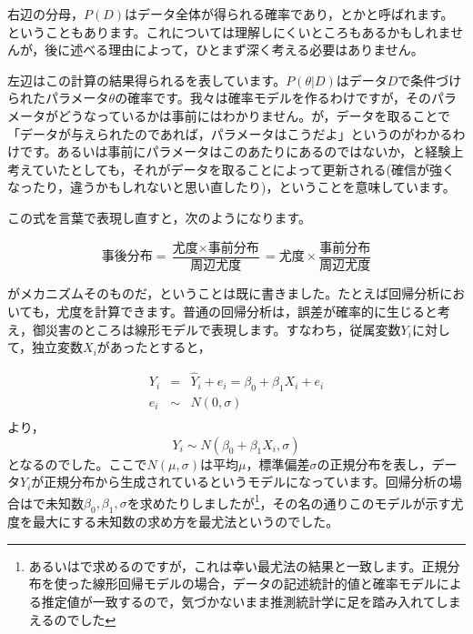 \documentclass{ltjsbook}
\begin{document}
右辺の分母，$P(D)$はデータ全体が得られる確率であり，とかと呼ばれます。ということもあります。これについては理解しにくいところもあるかもしれませんが，後に述べる理由によって，ひとまず深く考える必要はありません。

左辺はこの計算の結果得られるを表しています。$P(\theta|D)$はデータ$D$で条件づけられたパラメータ$\theta$の確率です。我々は確率モデルを作るわけですが，そのパラメータがどうなっているかは事前にはわかりません。が，データを取ることで「データが与えられたのであれば，パラメータはこうだよ」というのがわかるわけです。あるいは事前にパラメータはこのあたりにあるのではないか，と経験上考えていたとしても，それがデータを取ることによって更新される(確信が強くなったり，違うかもしれないと思い直したり)，ということを意味しています。

この式を言葉で表現し直すと，次のようになります。

$$ \mbox{事後分布} = \frac{\mbox{尤度}\times \mbox{事前分布}}{\mbox{周辺尤度}} = \mbox{尤度} \times \frac{事前分布}{周辺尤度}$$

がメカニズムそのものだ，ということは既に書きました。たとえば回帰分析においても，尤度を計算できます。普通の回帰分析は，誤差が確率的に生じると考え，御災害のところは線形モデルで表現します。すなわち，従属変数$Y_i$に対して，独立変数$X_i$があったとすると，

\begin{equation*}
    \begin{array}{lll}
        Y_i &=& \hat{Y}_i + e_i = \beta_0 + \beta_1 X_i + e_i\\
        e_i &\sim&  N(0,\sigma)\\
    \end{array}
\end{equation*}
より，
$$ Y_i \sim N(\beta_0 + \beta_1 X_i, \sigma) $$
となるのでした。ここで$N(\mu,\sigma)$は平均$\mu$，標準偏差$\sigma$の正規分布を表し，データ$Y_i$が正規分布から生成されているというモデルになっています。回帰分析の場合はで未知数$\beta_0,\beta_1,\sigma$を求めたりしましたが\footnote{あるいはで求めるのですが，これは幸い最尤法の結果と一致します。正規分布を使った線形回帰モデルの場合，データの記述統計的値と確率モデルによる推定値が一致するので，気づかないまま推測統計学に足を踏み入れてしまえるのでした}，その名の通りこのモデルが示す尤度を最大にする未知数の求め方を最尤法というのでした。
\end{document}
